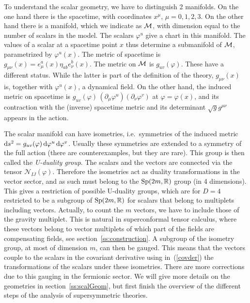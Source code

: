 \documentclass[a4paper,11pt,twoside]{article}
\newcommand{\Red}[1]{#1}
\def\rmd{{\rm d}}
\newcommand{\Symp}{\mathop{\rm {}Sp}}
\begin{document}
To understand the scalar geometry, we have to distinguish 2 manifolds. On
the one hand there is the spacetime, with coordinates $x^\mu $, $\mu
=0,1,2,3$. On the other hand there is a manifold, which we indicate as
${\cal M}$, with dimension equal to the number of scalars in the model.
The scalars $\Red{\varphi^u}$ give a chart in this manifold. The values
of a scalar at a spacetime point $x$ thus determine a submanifold of
${\cal M}$, parametrized by $\Red{\varphi^u}(x)$. The metric of spacetime
is $g_{\mu \nu }(x)=e_\mu ^a(x) \eta _{ab} e_\nu ^b(x)$. The metric on
${\cal M}$ is $\Red{g_{uv}(\varphi)}$. These have a different status.
While the latter is part of the definition of the theory, $g_{\mu \nu
}(x)$ is, together with $\Red{\varphi^u}(x)$, a dynamical field. On the
other hand, the induced metric on spacetime is $\Red{g_{uv}(\varphi
)}\,(\partial _\mu \Red{\varphi ^u})(\partial _\nu \Red{\varphi ^v})$ at
$\varphi =\varphi (x)$, and its contraction with the (inverse) spacetime
metric and its determinant $\sqrt{g}g^{\mu \nu }$ appears in the action.

The scalar manifold can have isometries, i.e.\ symmetries of the induced
metric $\rmd s^2=\Red{g_{uv}(\varphi )}\,\rmd \Red{\varphi ^u}\,\rmd
\Red{\varphi ^v}$. Usually these symmetries are extended to a symmetry of
the full action (there are counterexamples, but they are rare). This
group is then called the \emph{U-duality group}. The scalars and the
vectors are connected via the tensor $\Red{\mathcal{N}_{IJ}(\varphi )}$.
Therefore the isometries act as duality transformations in the vector
sector, and as such must belong to the $\Symp(2m,\mathbb{R})$ group (in 4
dimensions). This gives a restriction of possible U-duality groups, which
are for $D=4$ restricted to be a subgroup of $\Symp(2m,\mathbb{R})$ for
scalars that belong to multiplets including vectors. Actually, to count
the $m$ vectors, we have to include those of the gravity multiplet. This
is natural in superconformal tensor calculus, where these vectors belong
to vector multiplets of which part of the fields are compensating fields,
see section~\ref{ss:construction}. A subgroup of the isometry group, at
most of dimension $m$, can then be gauged. This means that the vectors
couple to the scalars in the covariant derivative using in~(\ref{covder})
the transformations of the scalars under these isometries. There are more
corrections due to this gauging in the fermionic sector. We will give
more details on the geometries in section~\ref{ss:scalGeom}, but first
finish the overview of the different steps of the analysis of
supersymmetric theories.
\end{document}
